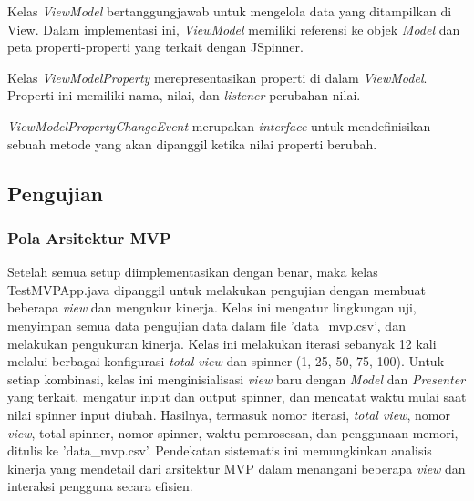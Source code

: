 \documentclass[conference]{IEEEtran}
\begin{document}
	Kelas \textit{ViewModel} bertanggungjawab untuk mengelola data yang ditampilkan di View. Dalam implementasi ini, \textit{ViewModel} memiliki referensi ke objek \textit{Model} dan peta properti-properti yang terkait dengan JSpinner.
	
	Kelas \textit{ViewModelProperty} merepresentasikan properti di dalam \textit{ViewModel}. Properti ini memiliki nama, nilai, dan \textit{listener} perubahan nilai.
	
	\textit{ViewModelPropertyChangeEvent} merupakan \textit{interface} untuk mendefinisikan sebuah metode yang akan dipanggil ketika nilai properti berubah.
	
	\subsection{Pengujian}
	\subsubsection{Pola Arsitektur MVP}
	Setelah semua setup diimplementasikan dengan benar, maka kelas TestMVPApp.java dipanggil untuk melakukan pengujian dengan membuat beberapa \textit{view} dan mengukur kinerja. Kelas ini mengatur lingkungan uji, menyimpan semua data pengujian data dalam file 'data\_mvp.csv', dan melakukan pengukuran kinerja. Kelas ini melakukan iterasi sebanyak 12 kali melalui berbagai konfigurasi \textit{total view} dan spinner (1, 25, 50, 75, 100). Untuk setiap kombinasi, kelas ini menginisialisasi \textit{view} baru dengan \textit{Model} dan \textit{Presenter} yang terkait, mengatur input dan output spinner, dan mencatat waktu mulai saat nilai spinner input diubah. Hasilnya, termasuk nomor iterasi, \textit{total view}, nomor \textit{view}, total spinner, nomor spinner, waktu pemrosesan, dan penggunaan memori, ditulis ke 'data\_mvp.csv'. Pendekatan sistematis ini memungkinkan analisis kinerja yang mendetail dari arsitektur MVP dalam menangani beberapa \textit{view} dan interaksi pengguna secara efisien.
	
\end{document}
